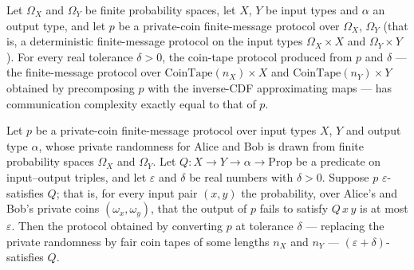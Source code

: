 \begin{theorem}
\label{CommunicationComplexity.PrivateCoin.FiniteMessage.Protocol.toCoinTape_complexity}
\leanok
{}
Let $\Omega_X$ and $\Omega_Y$ be finite probability spaces, let $X$, $Y$ be input types
and $\alpha$ an output type, and let $p$ be a private-coin finite-message protocol over
$\Omega_X$, $\Omega_Y$ (that is, a deterministic finite-message protocol on the input
types $\Omega_X \times X$ and $\Omega_Y \times Y$). For every real tolerance $\delta >
0$, the coin-tape protocol produced from $p$ and $\delta$ — the finite-message protocol
over $\mathrm{CoinTape}(n_X) \times X$ and $\mathrm{CoinTape}(n_Y) \times Y$ obtained by
precomposing $p$ with the inverse-CDF approximating maps — has communication complexity
exactly equal to that of $p$.
\end{theorem}

\begin{theorem}
\label{CommunicationComplexity.PrivateCoin.FiniteMessage.Protocol.toCoinTape_approxSatisfies}
\leanok
{}
Let $p$ be a private-coin finite-message protocol over input types $X$, $Y$ and output
type $\alpha$, whose private randomness for Alice and Bob is drawn from finite
probability spaces $\Omega_X$ and $\Omega_Y$. Let $Q : X \to Y \to \alpha \to
\mathrm{Prop}$ be a predicate on input–output triples, and let $\varepsilon$ and
$\delta$ be real numbers with $\delta > 0$. Suppose $p$ $\varepsilon$-satisfies $Q$;
that is, for every input pair $(x, y)$ the probability, over Alice's and Bob's private
coins $(\omega_x, \omega_y)$, that the output of $p$ fails to satisfy $Q\,x\,y$ is at
most $\varepsilon$. Then the protocol obtained by converting $p$ at tolerance $\delta$ —
replacing the private randomness by fair coin tapes of some lengths $n_X$ and $n_Y$ —
$(\varepsilon + \delta)$-satisfies $Q$.
\end{theorem}
